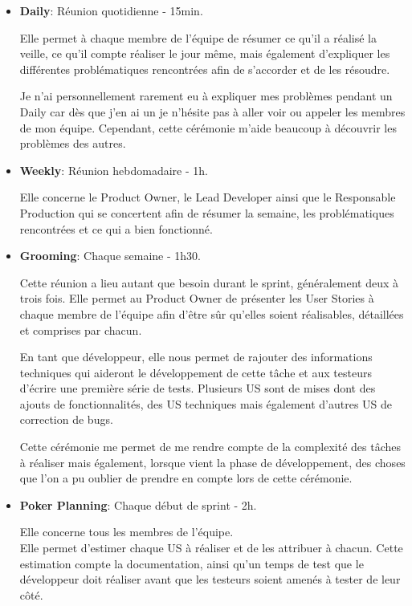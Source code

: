 \documentclass{article}
\begin{document}
\begin{itemize}
    \item \textbf{Daily}: Réunion quotidienne - 15min.
    
    Elle permet à chaque membre de l'équipe de résumer ce qu'il a réalisé la veille, ce qu'il compte réaliser le jour même, mais également d'expliquer les différentes problématiques rencontrées afin de s'accorder et de les résoudre.

    Je n'ai personnellement rarement eu à expliquer mes problèmes pendant un Daily car dès que j'en ai un je n'hésite pas à aller voir ou appeler les membres de mon équipe. Cependant, cette cérémonie m'aide beaucoup à découvrir les problèmes des autres.
    
    \item \textbf{Weekly}: Réunion hebdomadaire - 1h.
    
    Elle concerne le Product Owner, le Lead Developer ainsi que le Responsable Production qui se concertent afin de résumer la semaine, les problématiques rencontrées et ce qui a bien fonctionné.
    
    \item \textbf{Grooming}: Chaque semaine - 1h30.
    
    Cette réunion a lieu autant que besoin durant le sprint, généralement deux à trois fois. Elle permet au Product Owner de présenter les User Stories à chaque membre de l'équipe afin d'être sûr qu'elles soient réalisables, détaillées et comprises par chacun.
    
    En tant que développeur, elle nous permet de rajouter des informations techniques qui aideront le développement de cette tâche et aux testeurs d'écrire une première série de tests.
    Plusieurs US sont de mises dont des ajouts de fonctionnalités, des US techniques mais également d'autres US de correction de bugs.

    Cette cérémonie me permet de me rendre compte de la complexité des tâches à réaliser mais également, lorsque vient la phase de développement, des choses que l'on a pu oublier de prendre en compte lors de cette cérémonie.

    \item \textbf{Poker Planning}: Chaque début de sprint - 2h.
    
    Elle concerne tous les membres de l'équipe. \\
    Elle permet d'estimer chaque US à réaliser et de les attribuer à chacun. Cette estimation compte la documentation, ainsi qu'un temps de test que le développeur doit réaliser avant que les testeurs soient amenés à tester de leur côté.
    

\end{itemize}
\end{document}
